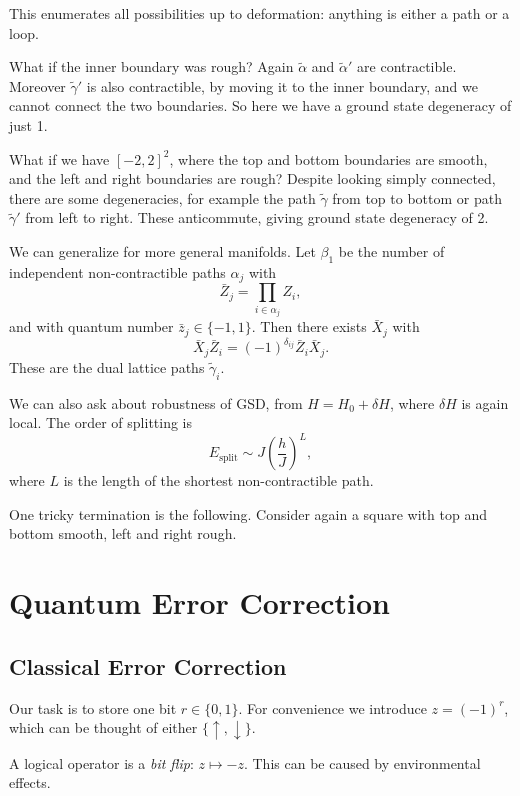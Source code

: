 \documentclass[12pt]{article}
\begin{document}
This enumerates all possibilities up to deformation: anything is either a path or a loop.

What if the inner boundary was rough? Again $\tilde \alpha$ and $\tilde \alpha'$ are contractible. Moreover $\tilde \gamma'$ is also contractible, by moving it to the inner boundary, and we cannot connect the two boundaries. So here we have a ground state degeneracy of just 1.

What if we have $[-2, 2]^2$, where the top and bottom boundaries are smooth, and the left and right boundaries are rough? Despite looking simply connected, there are some degeneracies, for example the path $\tilde \gamma$ from top to bottom or path $\tilde \gamma'$ from left to right. These anticommute, giving ground state degeneracy of 2.

We can generalize for more general manifolds. Let $\beta_1$ be the number of independent non-contractible paths $\alpha_j$ with
\[
\bar Z_j = \prod_{i \in \alpha_j} Z_i,
\]
and with quantum number $\bar z_j \in \{-1, 1\}$. Then there exists $\bar X_j$ with
\[
\bar X_j \bar Z_i = (-1)^{\delta_{ij}} \bar Z_i \bar X_j.
\]
These are the dual lattice paths $\tilde \gamma_i$.

We can also ask about robustness of GSD, from $H = H_0 + \delta H$, where $\delta H$ is again local. The order of splitting is
\[
E_{\mathrm{split}} \sim J \left( \frac{h}{J} \right)^{L},
\]
where $L$ is the length of the shortest non-contractible path.

One tricky termination is the following. Consider again a square with top and bottom smooth, left and right rough.


\newpage

\section{Quantum Error Correction}%
\label{sec:qec}

\subsection{Classical Error Correction}%
\label{sub:cec}

Our task is to store one bit $r \in \{0, 1\}$. For convenience we introduce $z = (-1)^{r}$, which can be thought of either $\{\uparrow, \downarrow\}$.

A logical operator is a \emph{bit flip}: $z \mapsto -z$. This can be caused by environmental effects.
\end{document}
